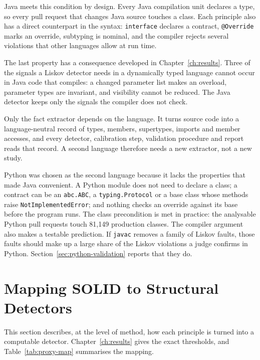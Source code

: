 Java meets this condition by design. Every Java compilation unit declares a type, so every pull
request that changes Java source touches a class. Each principle also has a direct counterpart in
the syntax: \texttt{interface} declares a contract, \texttt{@Override} marks an override, subtyping
is nominal, and the compiler rejects several violations that other languages allow at run time.

The last property has a consequence developed in Chapter~\ref{ch:results}. Three of the signals a
Liskov detector needs in a dynamically typed language cannot occur in Java code that compiles: a
changed parameter list makes an overload, parameter types are invariant, and visibility cannot be
reduced. The Java detector keeps only the signals the compiler does not check.

Only the fact extractor depends on the language. It turns source code into a language-neutral
record of types, members, supertypes, imports and member accesses, and every detector, calibration
step, validation procedure and report reads that record. A second language therefore needs a new
extractor, not a new study.

Python was chosen as the second language because it lacks the properties that made Java convenient.
A Python module does not need to declare a class; a contract can be an \texttt{abc.ABC}, a
\texttt{typing.Protocol} or a base class whose methods raise \texttt{NotImplementedError}; and
nothing checks an override against its base before the program runs. The class precondition is met
in practice: the analysable Python pull requests touch 81{,}149 production classes. The compiler
argument also makes a testable prediction. If \texttt{javac} removes a family of Liskov faults, those
faults should make up a large share of the Liskov violations a judge confirms in Python.
Section~\ref{sec:python-validation} reports that they do.

\section{Mapping SOLID to Structural Detectors}
\label{sec:proxy-mapping}

This section describes, at the level of method, how each principle is turned into a computable
detector. Chapter~\ref{ch:results} gives the exact thresholds, and Table~\ref{tab:proxy-map}
summarises the mapping.

